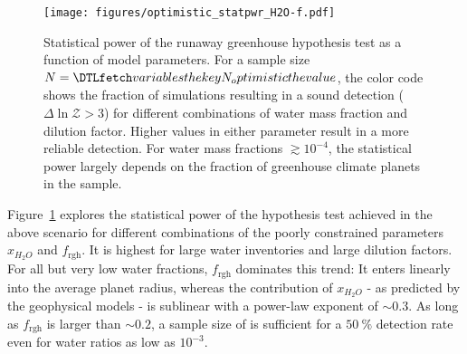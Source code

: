 \documentclass[modern]{aastex631}
\begin{document}
\begin{figure}[ht!]
    \begin{centering}
        \texttt{[image: figures/optimistic\_statpwr\_H2O-f.pdf]}
        \caption{
            Statistical power of the runaway greenhouse hypothesis test as a function of model parameters.
            For a sample size $N = \var{N_optimistic}$, the color code shows the fraction of simulations resulting in a sound detection ($\Delta \ln \mathcal{Z} > 3$) for different combinations of water mass fraction and dilution factor.
            Higher values in either parameter result in a more reliable detection.
            For water mass fractions $\gtrsim 10^{-4}$, the statistical power largely depends on the fraction of greenhouse climate planets in the sample.
        }
        \label{fig:statpwr_H2O-f}
    \end{centering}
\end{figure}
Figure~\ref{fig:statpwr_H2O-f} explores the statistical power of the hypothesis test achieved in the above scenario for different combinations of the poorly constrained parameters $x_{H_2O}$ and $f_\mathrm{rgh}$.
It is highest for large water inventories and large dilution factors.
 For all but very low water fractions, $f_\mathrm{rgh}$ dominates this trend: It enters linearly into the average planet radius, whereas the contribution of $x_{H_2O}$ - as predicted by the geophysical models - is sublinear with a power-law exponent of $\sim 0.3$.
As long as $f_\mathrm{rgh}$ is larger than $\sim 0.2$, a sample size of  is sufficient for a $\SI{50}{\percent}$ detection rate even for water ratios as low as $10^{-3}$.
\end{document}
